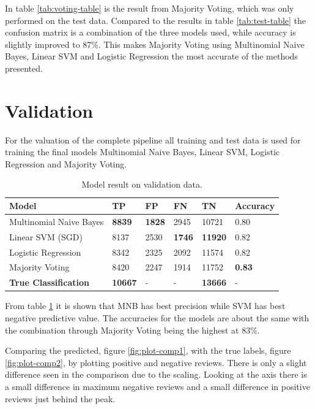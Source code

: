 In table \ref{tab:voting-table} is the result from Majority Voting, which was only performed on the test data. 
Compared to the results in table \ref{tab:test-table} the confusion matrix is a combination of the three models used, while accuracy is slightly improved to 87\%. 
This makes Majority Voting using Multinomial Naive Bayes, Linear SVM and Logistic Regression the most accurate of the methods presented. 


\section{Validation}
\label{sec:evaluation-result}

For the valuation of the complete pipeline all training and test data is used for training the final models Multinomial Naive Bayes, Linear SVM, Logistic Regression and Majority Voting. 

\begin{table}[H]
    \centering
    \caption{Model result on validation data.}
    \label{tab:validation-table}
    \begin{tabular}{@{}llllll@{}}
    \toprule
    Model                        & TP             & FP            & FN            & TN             & Accuracy      \\ \midrule
    Multinomial Naive Bayes      & \textbf{8839}  & \textbf{1828} & 2945          & 10721          & 0.80          \\
    Linear SVM (SGD)             & 8137           & 2530          & \textbf{1746} & \textbf{11920} & 0.82          \\
    Logistic Regression          & 8342           & 2325          & 2092          & 11574          & 0.82          \\
    Majority Voting              & 8420           & 2247          & 1914          & 11752          & \textbf{0.83} \\ \midrule
    \textbf{True Classification} & \textbf{10667} & -    & -    & \textbf{13666} & -             
    \end{tabular}
\end{table}

From table \ref{tab:validation-table} it is shown that MNB has best precision while SVM has best negative predictive value. 
The accuracies for the models are about the same with the combination through Majority Voting being the highest at 83\%.


Comparing the predicted, figure \ref{fig:plot-comp1}, with the true labels, figure \ref{fig:plot-comp2}, by plotting positive and negative reviews. 
There is only a slight difference seen in the comparison due to the scaling. 
Looking at the axis there is a small difference in maximum negative reviews and a small difference in positive reviews just behind the peak. 

